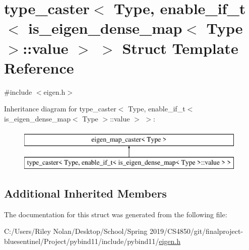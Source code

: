 \hypertarget{structtype__caster_3_01_type_00_01enable__if__t_3_01is__eigen__dense__map_3_01_type_01_4_1_1value_01_4_01_4}{}\section{type\+\_\+caster$<$ Type, enable\+\_\+if\+\_\+t$<$ is\+\_\+eigen\+\_\+dense\+\_\+map$<$ Type $>$\+::value $>$ $>$ Struct Template Reference}
\label{structtype__caster_3_01_type_00_01enable__if__t_3_01is__eigen__dense__map_3_01_type_01_4_1_1value_01_4_01_4}


{\ttfamily \#include $<$eigen.\+h$>$}

Inheritance diagram for type\+\_\+caster$<$ Type, enable\+\_\+if\+\_\+t$<$ is\+\_\+eigen\+\_\+dense\+\_\+map$<$ Type $>$\+::value $>$ $>$\+:\begin{figure}[H]
\begin{center}
\leavevmode
\includegraphics[height=2.000000cm]{structtype__caster_3_01_type_00_01enable__if__t_3_01is__eigen__dense__map_3_01_type_01_4_1_1value_01_4_01_4}
\end{center}
\end{figure}
\subsection*{Additional Inherited Members}


The documentation for this struct was generated from the following file\+:\begin{DoxyCompactItemize}
\item 
C\+:/\+Users/\+Riley Nolan/\+Desktop/\+School/\+Spring 2019/\+C\+S4850/git/finalproject-\/bluesentinel/\+Project/pybind11/include/pybind11/\mbox{\hyperlink{eigen_8h}{eigen.\+h}}\end{DoxyCompactItemize}
